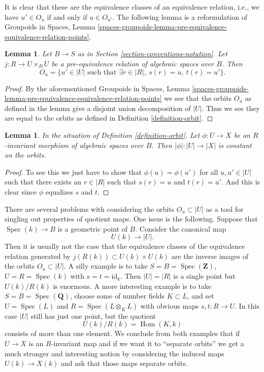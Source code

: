 \documentclass{stacks-project}
\theoremstyle{plain}
\newtheorem{lemma}[subsection]{Lemma}
\theoremstyle{definition}
\theoremstyle{remark}
\numberwithin{equation}{subsection}
\def\Spec{\mathop{\mathrm{Spec}}}
\def\Hom{\mathop{\mathrm{Hom}}\nolimits}
\begin{document}
\noindent
It is clear that these are the equivalence classes of an equivalence relation,
i.e., we have $u' \in O_u$ if and only if $u \in O_{u'}$. The following lemma
is a reformulation of
Groupoids in Spaces,
Lemma \ref{spaces-groupoids-lemma-pre-equivalence-equivalence-relation-points}.

\begin{lemma}
\label{lemma-pre-equivalence-equivalence-relation-points}
Let $B \to S$ as in Section \ref{section-conventions-notation}.
Let $j : R \to U \times_B U$ be a pre-equivalence relation
of algebraic spaces over $B$. Then
$$
O_u =
\{u' \in |U| \text{ such that } \exists r \in |R|, \ s(r) = u, \ t(r) = u'\}.
$$
\end{lemma}

\begin{proof}
By the aforementioned
Groupoids in Spaces,
Lemma \ref{spaces-groupoids-lemma-pre-equivalence-equivalence-relation-points}
we see that the orbits $O_u$ as defined in the lemma give a disjoint
union decomposition of $|U|$. Thus we see they are equal to the
orbits as defined in Definition \ref{definition-orbit}.
\end{proof}

\begin{lemma}
\label{lemma-invariant-map-constant-on-orbit}
In the situation of Definition \ref{definition-orbit}.
Let $\phi : U \to X$ be an $R$-invariant morphism of algebraic spaces over
$B$. Then $|\phi| : |U| \to |X|$ is constant on the orbits.
\end{lemma}

\begin{proof}
To see this we just have to show that $\phi(u) = \phi(u')$
for all $u, u' \in |U|$ such that
there exists an $r \in |R|$ such that $s(r) = u$ and $t(r) = u'$.
And this is clear since $\phi$ equalizes $s$ and $t$.
\end{proof}

\noindent
There are several problems with considering the orbits $O_u \subset |U|$
as a tool for singling out properties of quotient maps. One issue is the
following. Suppose that $\Spec(k) \to B$
is a geometric point of $B$. Consider the canonical map
$$
U(k) \longrightarrow |U|.
$$
Then it is usually not the case that the equivalence classes
of the equivalence relation generated by $j(R(k)) \subset U(k) \times U(k)$
are the inverse images of the orbits $O_u \subset |U|$.
A silly example is to take $S = B = \Spec(\mathbf{Z})$,
$U = R = \Spec(k)$ with $s = t = \text{id}_k$. Then $|U| = |R|$ is
a single point but $U(k)/R(k)$ is enormous.
A more interesting example is to take $S = B = \Spec(\mathbf{Q})$,
choose some of number fields $K \subset L$, and set $U = \Spec(L)$
and $R = \Spec(L \otimes_K L)$ with obvious maps $s, t : R \to U$.
In this case $|U|$ still has just one point, but the quotient
$$
U(k)/R(k) = \Hom(K, k)
$$
consists of more than one element. We conclude from both examples
that if $U \to X$ is an $R$-invariant map and if we want it to
``separate orbits'' we get a much stronger and interesting notion by
considering the induced maps $U(k) \to X(k)$ and ask that
those maps separate orbits.
\end{document}
